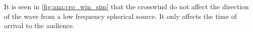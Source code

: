 
It is seen in \autoref{fig:ana:cro_win_sim} that the crosswind do not affect the direction of the wave from a low frequency spherical source. It only affects the time of arrival to the audience.






